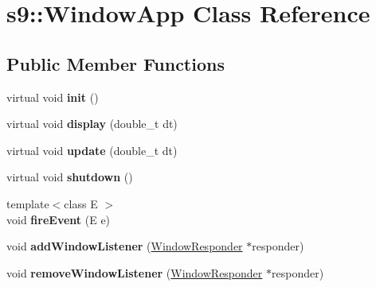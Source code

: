 \hypertarget{classs9_1_1WindowApp}{\section{s9\-:\-:Window\-App Class Reference}
\label{classs9_1_1WindowApp}
}
\subsection*{Public Member Functions}
\begin{DoxyCompactItemize}
\item 
\hypertarget{classs9_1_1WindowApp_ae9028614a6f0156549783f269277a7f6}{virtual void {\bfseries init} ()}\label{classs9_1_1WindowApp_ae9028614a6f0156549783f269277a7f6}

\item 
\hypertarget{classs9_1_1WindowApp_a83b54e6b0e8827690d8da9e7e0aa67b0}{virtual void {\bfseries display} (double\-\_\-t dt)}\label{classs9_1_1WindowApp_a83b54e6b0e8827690d8da9e7e0aa67b0}

\item 
\hypertarget{classs9_1_1WindowApp_a313c1f555b345989f2a0f63a2cc9f0df}{virtual void {\bfseries update} (double\-\_\-t dt)}\label{classs9_1_1WindowApp_a313c1f555b345989f2a0f63a2cc9f0df}

\item 
\hypertarget{classs9_1_1WindowApp_af86f0b24069adf0923177e44a65e8853}{virtual void {\bfseries shutdown} ()}\label{classs9_1_1WindowApp_af86f0b24069adf0923177e44a65e8853}

\item 
\hypertarget{classs9_1_1WindowApp_ae4d66d21443785ac8f5e84b4a06feb61}{{\footnotesize template$<$class E $>$ }\\void {\bfseries fire\-Event} (E e)}\label{classs9_1_1WindowApp_ae4d66d21443785ac8f5e84b4a06feb61}

\item 
\hypertarget{classs9_1_1WindowApp_a9bd82d7225895c6b4ca626bea6ce465c}{void {\bfseries add\-Window\-Listener} (\hyperlink{classs9_1_1WindowResponder}{Window\-Responder} $\ast$responder)}\label{classs9_1_1WindowApp_a9bd82d7225895c6b4ca626bea6ce465c}

\item 
\hypertarget{classs9_1_1WindowApp_ac972925c424384d04842bb9f148cd5dd}{void {\bfseries remove\-Window\-Listener} (\hyperlink{classs9_1_1WindowResponder}{Window\-Responder} $\ast$responder)}\label{classs9_1_1WindowApp_ac972925c424384d04842bb9f148cd5dd}

\end{DoxyCompactItemize}
